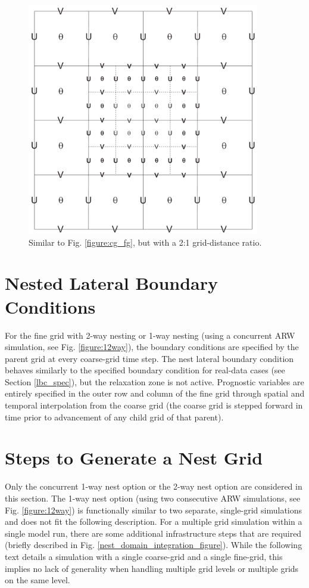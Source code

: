 %
%
\begin{figure}
  \centering
  \includegraphics[width=4in]{figures/cg_fg_x2.pdf}
  \caption{\label{figure:cg_fg_x2}
Similar to Fig. \ref{figure:cg_fg}, but with a 2:1 grid-distance ratio.
}
\end{figure}

\section{Nested Lateral Boundary Conditions}
\label{nest-lbc}

For the fine grid with 2-way nesting or 1-way nesting 
(using a concurrent ARW simulation, see 
Fig. \ref{figure:12way}),
the boundary conditions are specified by the parent grid
at every coarse-grid time step. The nest lateral boundary condition behaves similarly to the 
specified boundary condition for real-data cases (see Section \ref{lbc_spec}), but
the relaxation zone is not active. Prognostic variables are entirely specified in the outer row and column
of the fine grid through spatial and temporal interpolation from the coarse grid (the coarse grid is
stepped forward in time prior to advancement of any child grid of that parent).

\section{Steps to Generate a Nest Grid}

Only the concurrent 1-way nest option or the 2-way nest
option are considered in this section.  The 1-way nest option (using two
consecutive ARW simulations, see Fig. \ref{figure:12way}) 
is functionally similar to two separate,
single-grid simulations and does not fit the following description.  For
a multiple grid simulation within a single model run, there are some
additional infrastructure steps that are required (briefly described in
Fig. \ref{nest_domain_integration_figure}).  While the following text
details a simulation with a single coarse-grid and a single fine-grid,
this implies no lack of generality when handling multiple grid levels or
multiple grids on the same level.  

